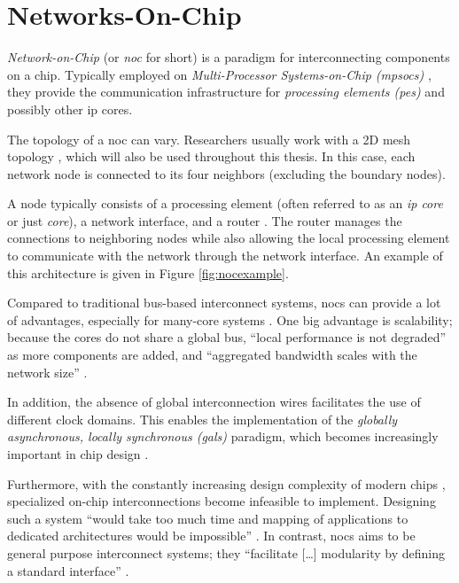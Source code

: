 \section{Networks-On-Chip}\label{sec:networkonchipfun}
\textit{Network-on-Chip} (or \textit{\gls{noc}} for short) is a paradigm for interconnecting components on a chip. Typically employed on
\textit{Multi-Processor Systems-on-Chip (\glspl{mpsoc})} \cites(e.g.)(){ivanov05nocintroduction}{biswas15routerattack}{tatas16designingnocs}, they
provide the communication infrastructure for \textit{processing elements (\glspl{pe})} and possibly other \gls{ip} cores.

The topology of a \gls{noc} can vary. Researchers usually work with a 2D mesh topology
\cites(e.g.)(){frey17hardenednoc}{kumar02networkonchip}{fernandes16nocrouting}{boraten16packetsecurity}, which will also be used throughout this thesis.
In this case, each network node is connected to its four neighbors (excluding the boundary nodes).

A node typically consists of a processing element (often referred to as an \textit{\gls{ip} core} or just \textit{core}), a network interface,
and a router \cite{dally01routepacketsnotwires}. The router manages the connections to neighboring nodes while also allowing
the local processing element to communicate with the network through the network interface. An example of this architecture is given in Figure
\vref{fig:nocexample}.

Compared to traditional bus-based interconnect systems, \glspl{noc} can provide a lot of advantages, especially for many-core systems
\cite[5\psqq]{tatas16designingnocs}. One big advantage is scalability; because the cores do not share a global bus, \enquote{local performance is not
degraded} \cite[6]{tatas16designingnocs} as more components are added, and \enquote{aggregated bandwidth scales with the network size}
\cite[6]{tatas16designingnocs}.

In addition, the absence of global interconnection wires facilitates the use of different clock domains. This enables the implementation of the
\textit{globally asynchronous, locally synchronous (\gls{gals})} paradigm, which becomes increasingly important in chip design
\cites[3]{kumar02networkonchip}[2]{ivanov05nocintroduction}.

Furthermore, with the constantly increasing design complexity of modern chips \cite{mack11mooreslaw}, specialized on-chip
interconnections become infeasible to implement. Designing such a system \enquote{would take too much time and mapping of applications to dedicated
architectures would be impossible} \cite[1]{kumar02networkonchip}. In contrast, \glspl{noc} aims to be general purpose interconnect systems; they
\enquote{facilitate […] modularity by defining a standard interface} \cite[1]{dally01routepacketsnotwires}.

